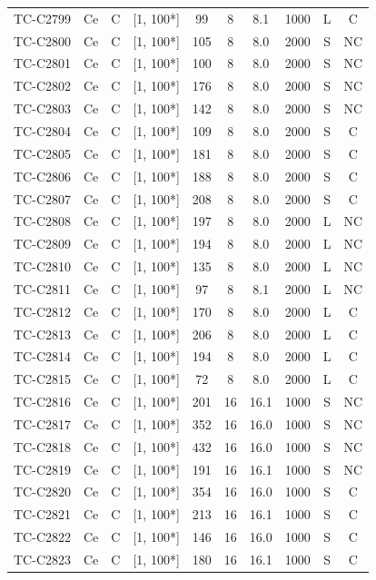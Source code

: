 \begin{longtable}{lccccccccc}
TC-C2799 & Ce & C & [1, 100*] & 99 & 8 & 8.1 & 1000 & L & C \\
TC-C2800 & Ce & C & [1, 100*] & 105 & 8 & 8.0 & 2000 & S & NC \\
TC-C2801 & Ce & C & [1, 100*] & 100 & 8 & 8.0 & 2000 & S & NC \\
TC-C2802 & Ce & C & [1, 100*] & 176 & 8 & 8.0 & 2000 & S & NC \\
TC-C2803 & Ce & C & [1, 100*] & 142 & 8 & 8.0 & 2000 & S & NC \\
TC-C2804 & Ce & C & [1, 100*] & 109 & 8 & 8.0 & 2000 & S & C \\
TC-C2805 & Ce & C & [1, 100*] & 181 & 8 & 8.0 & 2000 & S & C \\
TC-C2806 & Ce & C & [1, 100*] & 188 & 8 & 8.0 & 2000 & S & C \\
TC-C2807 & Ce & C & [1, 100*] & 208 & 8 & 8.0 & 2000 & S & C \\
TC-C2808 & Ce & C & [1, 100*] & 197 & 8 & 8.0 & 2000 & L & NC \\
TC-C2809 & Ce & C & [1, 100*] & 194 & 8 & 8.0 & 2000 & L & NC \\
TC-C2810 & Ce & C & [1, 100*] & 135 & 8 & 8.0 & 2000 & L & NC \\
TC-C2811 & Ce & C & [1, 100*] & 97 & 8 & 8.1 & 2000 & L & NC \\
TC-C2812 & Ce & C & [1, 100*] & 170 & 8 & 8.0 & 2000 & L & C \\
TC-C2813 & Ce & C & [1, 100*] & 206 & 8 & 8.0 & 2000 & L & C \\
TC-C2814 & Ce & C & [1, 100*] & 194 & 8 & 8.0 & 2000 & L & C \\
TC-C2815 & Ce & C & [1, 100*] & 72 & 8 & 8.0 & 2000 & L & C \\
TC-C2816 & Ce & C & [1, 100*] & 201 & 16 & 16.1 & 1000 & S & NC \\
TC-C2817 & Ce & C & [1, 100*] & 352 & 16 & 16.0 & 1000 & S & NC \\
TC-C2818 & Ce & C & [1, 100*] & 432 & 16 & 16.0 & 1000 & S & NC \\
TC-C2819 & Ce & C & [1, 100*] & 191 & 16 & 16.1 & 1000 & S & NC \\
TC-C2820 & Ce & C & [1, 100*] & 354 & 16 & 16.0 & 1000 & S & C \\
TC-C2821 & Ce & C & [1, 100*] & 213 & 16 & 16.1 & 1000 & S & C \\
TC-C2822 & Ce & C & [1, 100*] & 146 & 16 & 16.0 & 1000 & S & C \\
TC-C2823 & Ce & C & [1, 100*] & 180 & 16 & 16.1 & 1000 & S & C \\

\end{longtable}
